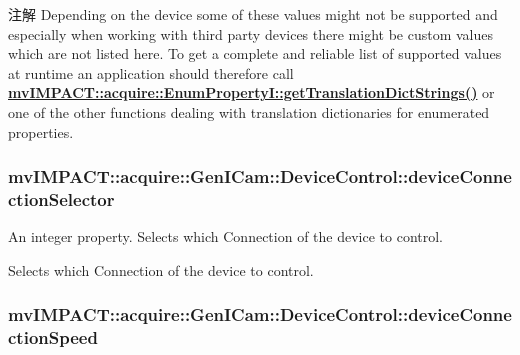 \begin{DoxyNote}{注解}
Depending on the device some of these values might not be supported and especially when working with third party devices there might be custom values which are not listed here. To get a complete and reliable list of supported values at runtime an application should therefore call {\bfseries \hyperlink{classmv_i_m_p_a_c_t_1_1acquire_1_1_enum_property_i_a0ba6ccbf5ee69784d5d0b537924d26b6}{mv\+I\+M\+P\+A\+C\+T\+::acquire\+::\+Enum\+Property\+I\+::get\+Translation\+Dict\+Strings()}} or one of the other functions dealing with translation dictionaries for enumerated properties. 
\end{DoxyNote}
\hypertarget{classmv_i_m_p_a_c_t_1_1acquire_1_1_gen_i_cam_1_1_device_control_a1f72049fbb30bfcb8fd0ca6582ea5f16}{
\subsubsection[{device\+Connection\+Selector}]{ mv\+I\+M\+P\+A\+C\+T\+::acquire\+::\+Gen\+I\+Cam\+::\+Device\+Control\+::device\+Connection\+Selector}}\label{classmv_i_m_p_a_c_t_1_1acquire_1_1_gen_i_cam_1_1_device_control_a1f72049fbb30bfcb8fd0ca6582ea5f16}


An integer property. Selects which Connection of the device to control. 

Selects which Connection of the device to control. \hypertarget{classmv_i_m_p_a_c_t_1_1acquire_1_1_gen_i_cam_1_1_device_control_a8c2446d5d474ae2805b3f56050361686}{
\subsubsection[{device\+Connection\+Speed}]{ mv\+I\+M\+P\+A\+C\+T\+::acquire\+::\+Gen\+I\+Cam\+::\+Device\+Control\+::device\+Connection\+Speed}}\label{classmv_i_m_p_a_c_t_1_1acquire_1_1_gen_i_cam_1_1_device_control_a8c2446d5d474ae2805b3f56050361686}


